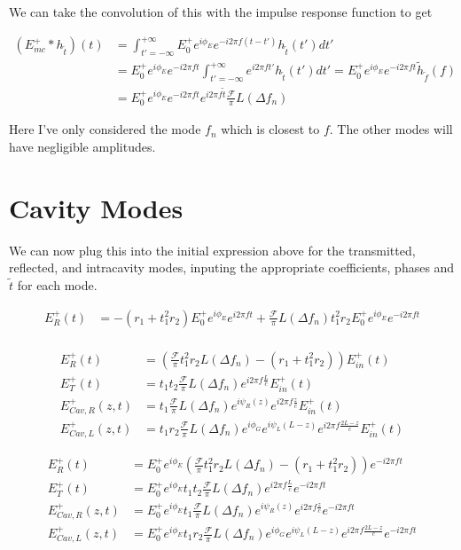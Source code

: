 \documentclass[12pt]{article}
\begin{document}
We can take the convolution of this with the impulse response function to get

\begin{align}
\left(E_{mc}^+ \ast h_{\tilde{t}}\right)(t) &= \int_{t'=-\infty}^{+\infty} E_0^+ e^{i\phi_E}e^{-i 2\pi f (t-t')}h_{\tilde{t}}(t') dt'\\
&= E_0^+e^{i\phi_E}e^{-i 2\pi f t} \int_{t'=-\infty}^{+\infty} e^{i 2 \pi f t'} h_{\tilde{t}}(t') dt' = E_0^+ e^{i\phi_E}e^{-i2\pi f t} \tilde{h}_{\tilde{f}}(f)\\
&= E_0^+e^{i\phi_E}e^{-i 2 \pi f t} e^{i 2\pi f \tilde{t}} \frac{\mathcal{F}}{\pi} L(\Delta f_n)
\end{align}

Here I've only considered the mode $f_n$ which is closest to $f$. The other modes will have negligible amplitudes.

\section{Cavity Modes}

We can now plug this into the initial expression above for the transmitted, reflected, and intracavity modes, inputing the appropriate coefficients, phases and $\tilde{t}$ for each mode.

\begin{align}
E_R^+(t) &= -(r_1+t_1^2 r_2) E_0^+ e^{i\phi_E}e^{i 2\pi f t} + \frac{\mathcal{F}}{\pi}L(\Delta f_n) t_1^2 r_2 E_0^+ e^{i\phi_E}e^{-i 2\pi f t}\\
\end{align}



\begin{align}
E_R^+(t) &= \left(\frac{\mathcal{F}}{\pi} t_1^2 r_2 L(\Delta f_n) - (r_1 + t_1^2 r_2)\right) E_{in}^+(t)\\
E_T^+(t) &=t_1t_2 \frac{\mathcal{F}}{\pi} L(\Delta f_n) e^{i 2\pi f \frac{L}{c}} E_{in}^+(t)\\
E_{Cav,R}^+(z,t) &=t_1 \frac{\mathcal{F}}{\pi} L(\Delta f_n)e^{i \psi_R(z)}  e^{i 2\pi f \frac{z}{c}} E_{in}^+(t)\\
E_{Cav,L}^+(z,t) &= t_1r_2 \frac{\mathcal{F}}{\pi} L(\Delta f_n) e^{i \phi_G} e^{i\psi_L(L-z)} e^{i 2\pi f \frac{2L-z}{c}} E_{in}^+(t)
\end{align}

\begin{align}
E_R^+(t) &= E_0^+ e^{i\phi_E}\left(\frac{\mathcal{F}}{\pi} t_1^2 r_2 L(\Delta f_n) - (r_1 + t_1^2 r_2)\right)  e^{-i2\pi ft}\\
E_T^+(t) &= E_0^+ e^{i\phi_E}t_1t_2 \frac{\mathcal{F}}{\pi} L(\Delta f_n) e^{i 2\pi f \frac{L}{c}} e^{-i 2\pi ft}\\
E_{Cav,R}^+(z,t) &= E_0^+ e^{i\phi_E}t_1  \frac{\mathcal{F}}{\pi} L(\Delta f_n)  e^{i \psi_R(z)}e^{i 2\pi f \frac{z}{c}} e^{-i2\pi f t}\\
E_{Cav,L}^+(z,t) &= E_0^+ e^{i\phi_E}t_1r_2 \frac{\mathcal{F}}{\pi} L(\Delta f_n) e^{i \phi_G} e^{i\psi_L(L-z)} e^{i 2\pi f \frac{2L-z}{c}} e^{-i2\pi ft}\\
\end{align}
\end{document}
